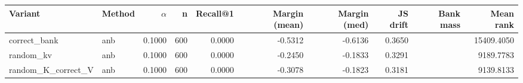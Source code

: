 \begin{tabular}{l l r r r r r r r r}
\toprule
Variant & Method & $\alpha$ & n & Recall@1 & Margin (mean) & Margin (med) & JS drift & Bank mass & Mean rank \\
\midrule
correct\_bank & anb & 0.1000 & 600 & 0.0000 & -0.5312 & -0.6136 & 0.3650 &  & 15409.4050 \\
random\_kv & anb & 0.1000 & 600 & 0.0000 & -0.2450 & -0.1833 & 0.3291 &  & 9189.7783 \\
random\_K\_correct\_V & anb & 0.1000 & 600 & 0.0000 & -0.3078 & -0.1823 & 0.3181 &  & 9139.8133 \\
\bottomrule
\end{tabular}
